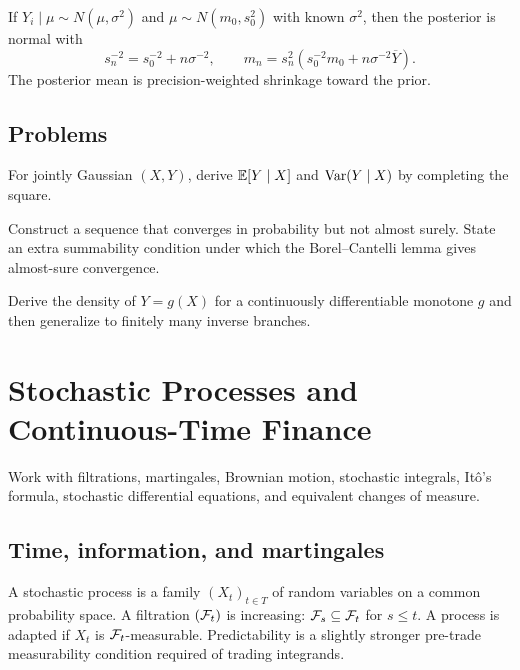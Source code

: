 \begin{example}
If $Y_i\mid\mu\sim N(\mu,\sigma^2)$ and
$\mu\sim N(m_0,s_0^2)$ with known $\sigma^2$, then the posterior is normal with
\[
s_n^{-2}=s_0^{-2}+n\sigma^{-2},\qquad
m_n=s_n^2(s_0^{-2}m_0+n\sigma^{-2}\overline Y).
\]
The posterior mean is precision-weighted shrinkage toward the prior.
\end{example}

\section{Problems}

\begin{exercise}
For jointly Gaussian $(X,Y)$, derive $\operatorname{\mathbb E}[Y\mid X]$ and
$\operatorname{Var}(Y\mid X)$ by completing the square.
\end{exercise}
\begin{exercise}
Construct a sequence that converges in probability but not almost surely. State an
extra summability condition under which the Borel--Cantelli lemma gives almost-sure
convergence.
\end{exercise}
\begin{exercise}
Derive the density of $Y=g(X)$ for a continuously differentiable monotone $g$ and
then generalize to finitely many inverse branches.
\end{exercise}


\chapter{Stochastic Processes and Continuous-Time Finance}

\begin{objectives}
Work with filtrations, martingales, Brownian motion, stochastic integrals, Itô's
formula, stochastic differential equations, and equivalent changes of measure.
\end{objectives}

\section{Time, information, and martingales}

A stochastic process is a family $(X_t)_{t\in T}$ of random variables on a common
probability space. A filtration $(\mathcal F_t)$ is increasing: $\mathcal F_s\subseteq\mathcal F_t$ for
$s\leq t$. A process is adapted if $X_t$ is $\mathcal F_t$-measurable. Predictability is a
slightly stronger pre-trade measurability condition required of trading integrands.

